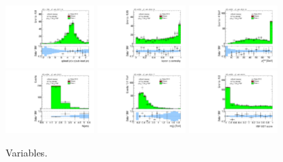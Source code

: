 \begin{figure}[!htpb]
  \includegraphics[width=0.30\textwidth]{figures/analysis/vbf-ZllCR/jets-etaprod}
  \includegraphics[width=0.30\textwidth]{figures/analysis/vbf-ZllCR/lep-eta-centrality}
  \includegraphics[width=0.30\textwidth]{figures/analysis/vbf-ZllCR/system-pt} \\
  \includegraphics[width=0.30\textwidth]{figures/analysis/vbf-ZllCR/n-jets30}
  \includegraphics[width=0.30\textwidth]{figures/analysis/vbf-ZllCR/dijet-m-veryhigh}
  \includegraphics[width=0.30\textwidth]{figures/analysis/vbf-ZllCR/BDTEve-VBF} \\
  \caption{Variables.}
  \label{fig:backgrounds-ZllCR-jets}
\end{figure}

